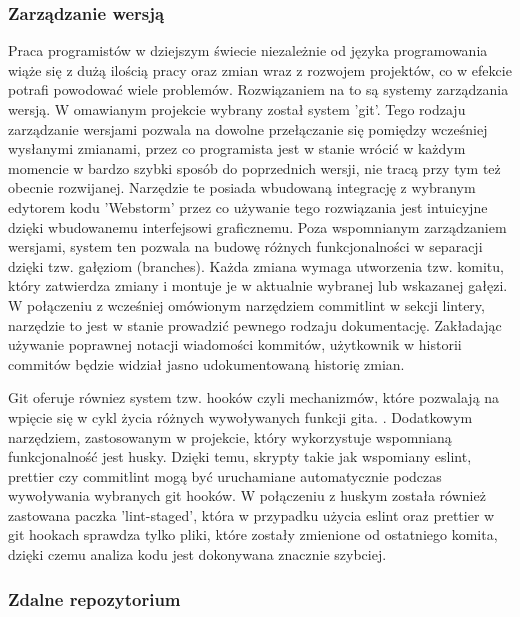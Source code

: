 \subsubsection{Zarządzanie wersją}

Praca programistów w dziejszym świecie niezależnie od języka programowania wiąże się z dużą ilością pracy oraz zmian wraz z rozwojem projektów, co w efekcie potrafi powodować wiele problemów. Rozwiązaniem na to są systemy zarządzania wersją. W omawianym projekcie wybrany został system 'git'. Tego rodzaju zarządzanie wersjami pozwala na dowolne przełączanie się pomiędzy wcześniej wysłanymi zmianami, przez co programista jest w stanie wrócić w każdym momencie w bardzo szybki sposób do poprzednich wersji, nie tracą przy tym też obecnie rozwijanej. Narzędzie te posiada wbudowaną integrację z wybranym edytorem kodu 'Webstorm' przez co używanie tego rozwiązania jest intuicyjne dzięki wbudowanemu interfejsowi graficznemu. Poza wspomnianym zarządzaniem wersjami, system ten pozwala na budowę różnych funkcjonalności w separacji dzięki tzw. gałęziom (branches). Każda zmiana wymaga utworzenia tzw. komitu, który zatwierdza zmiany i montuje je w aktualnie wybranej lub wskazanej gałęzi.
W połączeniu z wcześniej omówionym narzędziem commitlint w sekcji lintery, narzędzie to jest w stanie prowadzić pewnego rodzaju dokumentację. Zakładając używanie poprawnej notacji wiadomości kommitów, użytkownik w historii commitów będzie widział jasno udokumentowaną historię zmian.

Git oferuje równiez system tzw. hooków czyli mechanizmów, które pozwalają na wpięcie się w cykl życia różnych wywoływanych funkcji gita. \cite{GitHooksDocs}. Dodatkowym narzędziem, zastosowanym w projekcie, który wykorzystuje wspomnianą funkcjonalność jest husky. Dzięki temu, skrypty takie jak wspomiany eslint, prettier czy commitlint mogą być uruchamiane automatycznie podczas wywoływania wybranych git hooków. W połączeniu z huskym została również zastowana paczka 'lint-staged', która w przypadku użycia eslint oraz prettier w git hookach sprawdza tylko pliki, które zostały zmienione od ostatniego komita, dzięki czemu analiza kodu jest dokonywana znacznie szybciej.

\subsubsection{Zdalne repozytorium}

